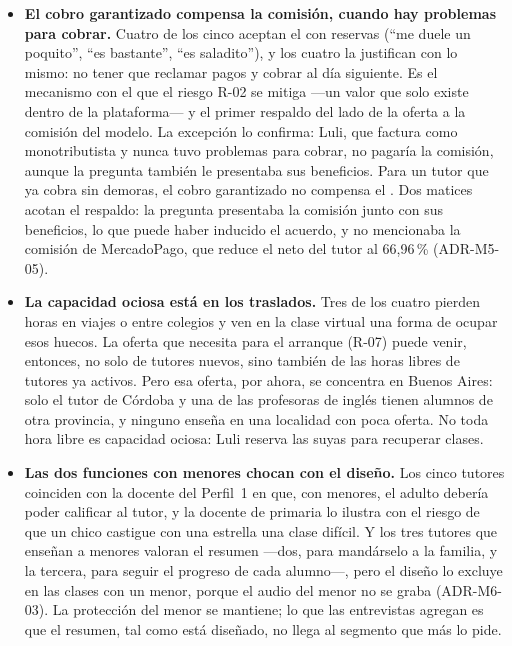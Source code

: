 \begin{itemize}
    \item \textbf{El cobro garantizado compensa la comisión, cuando
          hay problemas para cobrar.} Cuatro de los cinco
          aceptan el \comision{} con reservas (``me duele un poquito'',
          ``es bastante'', ``es saladito''), y los cuatro la justifican con
          lo mismo: no tener que reclamar pagos y cobrar al día siguiente.
          Es el mecanismo con el que el riesgo R-02 se mitiga ---un valor
          que solo existe dentro de la plataforma--- y el primer respaldo
          del lado de la oferta a la comisión del modelo. La excepción lo
          confirma: Luli, que factura como monotributista y nunca tuvo
          problemas para cobrar, no pagaría la comisión, aunque la
          pregunta también le presentaba sus beneficios. Para un tutor que
          ya cobra sin demoras, el cobro garantizado no compensa el
          \comision{}. Dos matices acotan el respaldo: la pregunta
          presentaba la comisión junto con sus beneficios, lo que puede
          haber inducido el acuerdo, y no mencionaba la comisión de
          MercadoPago, que reduce el neto del tutor al 66,96\,\%
          (ADR-M5-05).
    \item \textbf{La capacidad ociosa está en los traslados.} Tres de los
          cuatro pierden horas en viajes o entre colegios y ven en la clase
          virtual una forma de ocupar esos huecos. La oferta que \sistema{}
          necesita para el arranque (R-07) puede venir, entonces, no solo de
          tutores nuevos, sino también de las horas libres de tutores ya
          activos. Pero esa oferta, por ahora, se concentra en Buenos
          Aires: solo el tutor de Córdoba y una de las profesoras de
          inglés tienen alumnos de otra provincia, y ninguno enseña en una
          localidad con poca oferta. No toda hora libre es capacidad
          ociosa: Luli reserva las suyas para recuperar clases.
    \item \textbf{Las dos funciones con menores chocan con el diseño.} Los
          cinco tutores coinciden con la docente del Perfil~1 en que, con menores,
          el adulto debería poder calificar al tutor, y la docente de
          primaria lo ilustra con el riesgo de que un chico castigue con
          una estrella una clase difícil. Y los tres tutores que enseñan a
          menores valoran el resumen ---dos, para mandárselo a la familia,
          y la tercera, para seguir el progreso de cada alumno---, pero el
          diseño lo excluye en las clases con un menor, porque el audio del menor
          no se graba (ADR-M6-03). La protección del menor se mantiene;
          lo que las entrevistas agregan es que el resumen, tal como está
          diseñado, no llega al segmento que más lo pide.
\end{itemize}

